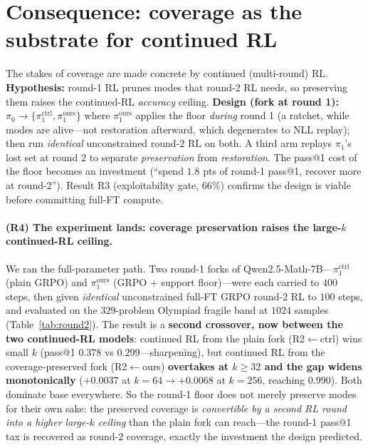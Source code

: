 \documentclass[11pt]{article}
\theoremstyle{definition}
\begin{document}
\section{Consequence: coverage as the substrate for continued RL}
\label{sec:round2}
The stakes of coverage are made concrete by continued (multi-round) RL. \textbf{Hypothesis:} round-1
RL prunes modes that round-2 RL needs, so preserving them raises the continued-RL \emph{accuracy}
ceiling. \textbf{Design (fork at round 1):} $\pi_0\!\to\!\{\pi_1^{\text{ctrl}},\pi_1^{\text{ours}}\}$
where $\pi_1^{\text{ours}}$ applies the floor \emph{during} round 1 (a ratchet, while modes are
alive---not restoration afterward, which degenerates to NLL replay); then run \emph{identical}
unconstrained round-2 RL on both. A third arm replays $\pi_1$'s lost set at round 2 to separate
\emph{preservation} from \emph{restoration}. The pass@1 cost of the floor becomes an investment
(``spend $1.8$ pts of round-1 pass@1, recover more at round-2''). Result R3 (exploitability gate,
$66\%$) confirms the design is viable before committing full-FT compute.

\paragraph{(R4) The experiment lands: coverage preservation raises the large-$k$ continued-RL ceiling.}
We ran the full-parameter path. Two round-1 forks of Qwen2.5-Math-7B---$\pi_1^{\text{ctrl}}$ (plain
GRPO) and $\pi_1^{\text{ours}}$ (GRPO $+$ support floor)---were each carried to $400$ steps, then given
\emph{identical} unconstrained full-FT GRPO round-2 RL to $100$ steps, and evaluated on the
$329$-problem Olympiad fragile band at $1024$ samples (Table~\ref{tab:round2}). The result is a
\textbf{second crossover, now between the two continued-RL models}: continued RL from the plain fork
(R2$\leftarrow$ctrl) wins small $k$ (pass@1 $0.378$ vs $0.299$---sharpening), but continued RL from the
coverage-preserved fork (R2$\leftarrow$ours) \textbf{overtakes at $k\ge32$ and the gap widens
monotonically} ($+0.0037$ at $k{=}64 \to +0.0068$ at $k{=}256$, reaching $0.990$). Both dominate base
everywhere. So the round-1 floor does not merely preserve modes for their own sake: the preserved
coverage is \emph{convertible by a second RL round into a higher large-$k$ ceiling} than the plain
fork can reach---the round-1 pass@1 tax is recovered as round-2 coverage, exactly the investment the
design predicted.
\end{document}
